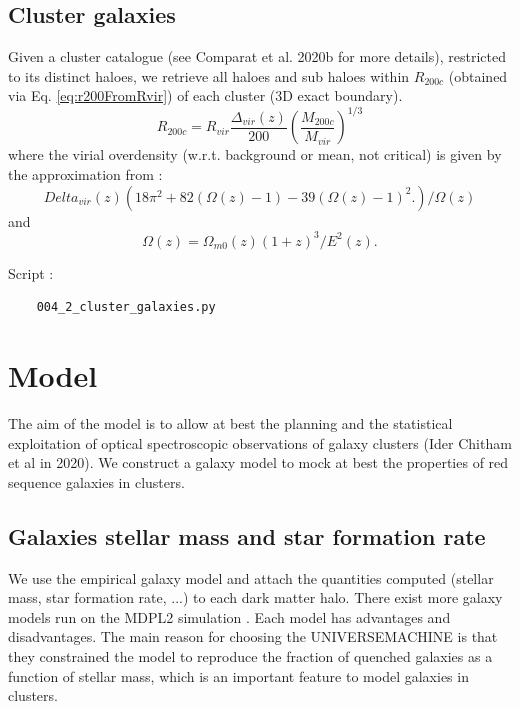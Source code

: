 \documentclass[fleqn,usenatbib,onecolumn]{mnras}
\begin{document}
\subsection{Cluster galaxies} 

Given a cluster catalogue (see Comparat et al. 2020b for more details), restricted to its distinct haloes, we retrieve all haloes and sub haloes within $R_{200c}$ (obtained via Eq. \ref{eq:r200FromRvir}) of each cluster (3D exact boundary). 
\begin{equation}
R_{200c} = R_{vir} \frac{ \Delta_{vir}(z) }{ 200} \left( \frac{M_{200c}}{M_{vir}} \right)^{1/3}
\label{eq:r200FromRvir}
\end{equation}
where the virial overdensity (w.r.t. background or mean, not critical) is given by the approximation from \citet{Bryan98ApJ...495...80B}:
\begin{equation}
Delta_{vir}(z) (18 \pi^2 + 82 (\Omega(z)-1)- 39 (\Omega(z)-1)^2.) /\Omega(z)
\end{equation}
and 
\begin{equation}
\Omega(z) =  \Omega_{m0}(z) (1+z)^3 / E^2(z).
\end{equation}

Script :
\begin{verbatim}
    004_2_cluster_galaxies.py
\end{verbatim}


\section{Model}
\label{sec:optical:cluster:model}

The aim of the model is to allow at best the planning and the statistical exploitation of optical spectroscopic observations of galaxy clusters (Ider Chitham et al in 2020). 
We construct a galaxy model to mock at best the properties of red sequence galaxies in clusters. 

\subsection{Galaxies stellar mass and star formation rate}
\label{subsec:galaxies:overall}

We use the \citet[\textsc{UNIVERSEMACHINE}][]{Behroozi2019MNRAS.488.3143B} empirical galaxy model and attach the quantities computed (stellar mass, star formation rate, ...) to each dark matter halo. 
There exist more galaxy models run on the \textsc{MDPL2} simulation \citep{Stoppacher2019MNRAS.486.1316S}. 
Each model has advantages and disadvantages. 
The main reason for choosing the \textsc{UNIVERSEMACHINE} is that they constrained the model to reproduce the fraction of quenched galaxies as a function of stellar mass, which is an important feature to model galaxies in clusters.
\end{document}

